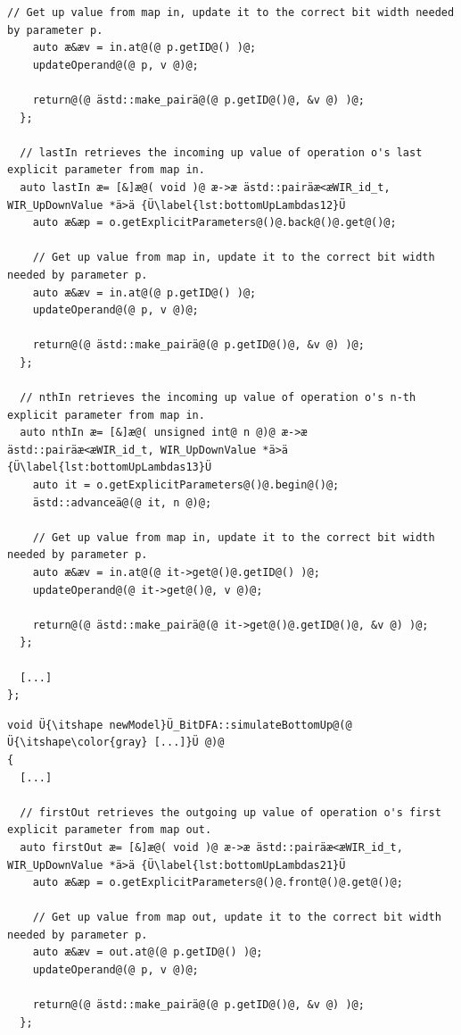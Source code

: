 \begin{enumerate}[resume]
\begin{lstlisting}[style=code,float=!t,caption={Definition of Lambdas for Bottom-Up Analysis},label=lst:bottomUpLambdas1]
    // Get up value from map in, update it to the correct bit width needed by parameter p.
    auto æ&æv = in.at@(@ p.getID@() )@;
    updateOperand@(@ p, v @)@;

    return@(@ ästd::make_pairä@(@ p.getID@()@, &v @) )@;
  };

  // lastIn retrieves the incoming up value of operation o's last explicit parameter from map in.
  auto lastIn æ= [&]æ@( void )@ æ->æ ästd::pairäæ<æWIR_id_t, WIR_UpDownValue *ä>ä {Ü\label{lst:bottomUpLambdas12}Ü
    auto æ&æp = o.getExplicitParameters@()@.back@()@.get@()@;

    // Get up value from map in, update it to the correct bit width needed by parameter p.
    auto æ&æv = in.at@(@ p.getID@() )@;
    updateOperand@(@ p, v @)@;

    return@(@ ästd::make_pairä@(@ p.getID@()@, &v @) )@;
  };

  // nthIn retrieves the incoming up value of operation o's n-th explicit parameter from map in.
  auto nthIn æ= [&]æ@( unsigned int@ n @)@ æ->æ ästd::pairäæ<æWIR_id_t, WIR_UpDownValue *ä>ä {Ü\label{lst:bottomUpLambdas13}Ü
    auto it = o.getExplicitParameters@()@.begin@()@;
    ästd::advanceä@(@ it, n @)@;

    // Get up value from map in, update it to the correct bit width needed by parameter p.
    auto æ&æv = in.at@(@ it->get@()@.getID@() )@;
    updateOperand@(@ it->get@()@, v @)@;

    return@(@ ästd::make_pairä@(@ it->get@()@.getID@()@, &v @) )@;
  };

  [...]
};
\end{lstlisting}

\begin{lstlisting}[style=code,float=!t,caption={Definition of Lambdas for Bottom-Up Analysis (ctd.)},label=lst:bottomUpLambdas2]
void Ü{\itshape newModel}Ü_BitDFA::simulateBottomUp@(@ Ü{\itshape\color{gray} [...]}Ü @)@
{
  [...]

  // firstOut retrieves the outgoing up value of operation o's first explicit parameter from map out.
  auto firstOut æ= [&]æ@( void )@ æ->æ ästd::pairäæ<æWIR_id_t, WIR_UpDownValue *ä>ä {Ü\label{lst:bottomUpLambdas21}Ü
    auto æ&æp = o.getExplicitParameters@()@.front@()@.get@()@;

    // Get up value from map out, update it to the correct bit width needed by parameter p.
    auto æ&æv = out.at@(@ p.getID@() )@;
    updateOperand@(@ p, v @)@;

    return@(@ ästd::make_pairä@(@ p.getID@()@, &v @) )@;
  };


\end{lstlisting}
\end{enumerate}
